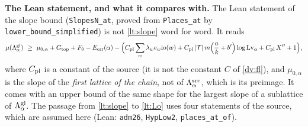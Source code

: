 \documentclass[11pt,letterpaper]{article}
\begin{document}
\textbf{The Lean statement, and what it compares with.} The Lean statement of the slope bound
(\texttt{SlopesN\_at}, proved from \texttt{Places\_at} by \texttt{lower\_bound\_simplified}) is not
\eqref{lt:slope} word for word. It reads
\begin{equation}\label{lt:Lo}
 \mu(\Lambda^{\rm gl}_\alpha)\ \ge\ \mu_{0,\alpha}+G_{\rm top}+F_0-E_{\rm err}(\alpha)
 -\Big(C_{\rm pl}\sum_w\lambda_we_w\mathrm{io}(w)+C_{\rm pl}\,|\mathcal T|\,m\Big(\frac ak+b'\Big)\log\mathrm{Lv}_\alpha
   +C_{\rm pl}\,X''+1\Big),
\end{equation}
where $C_{\rm pl}$ is a constant of the source (it is not the constant $C$ of \eqref{dv:fl}), and
$\mu_{0,\alpha}$ is the slope of the \emph{first lattice of the chain}, not of
$\Lambda^{\rm src}_\alpha$, which is its preimage. It comes with an upper bound of the same shape for the
largest slope of a sublattice of $\Lambda^{\rm gl}_\alpha$. The passage from \eqref{lt:slope} to
\eqref{lt:Lo} uses four statements of the source, which are assumed here (Lean: \texttt{adm26},
\texttt{HypLow2}, \texttt{places\_at\_of}).
\end{document}
